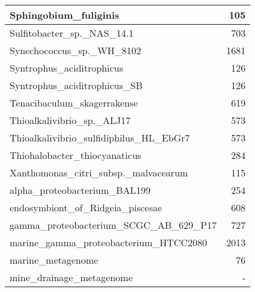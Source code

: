 \documentclass[12pt,a4paper]{article}
\begin{document}
\begin{table}[ht]
\begin{center}
\begin{tabular}{|l*{1}{|r}|}
Sphingobium\_fuliginis & 105 \\ \hline
Sulfitobacter\_sp.\_NAS\_14.1 & 703 \\ \hline
Synechococcus\_sp.\_WH\_8102 & 1681 \\ \hline
Syntrophus\_aciditrophicus & 126 \\ \hline
Syntrophus\_aciditrophicus\_SB & 126 \\ \hline
Tenacibaculum\_skagerrakense & 619 \\ \hline
Thioalkalivibrio\_sp.\_ALJ17 & 573 \\ \hline
Thioalkalivibrio\_sulfidiphilus\_HL\_EbGr7 & 573 \\ \hline
Thiohalobacter\_thiocyanaticus & 284 \\ \hline
Xanthomonas\_citri\_subsp.\_malvacearum & 115 \\ \hline
alpha\_proteobacterium\_BAL199 & 254 \\ \hline
endosymbiont\_of\_Ridgeia\_piscesae & 608 \\ \hline
gamma\_proteobacterium\_SCGC\_AB\_629\_P17 & 727 \\ \hline
marine\_gamma\_proteobacterium\_HTCC2080 & 2013 \\ \hline
marine\_metagenome & 76 \\ \hline
mine\_drainage\_metagenome & - \\ \hline
\end{tabular}
\end{center}
\end{table}
\end{document}
